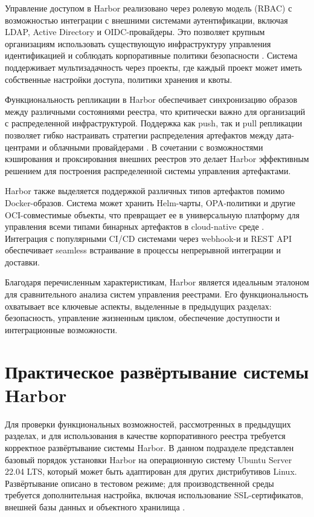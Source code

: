 Управление доступом в Harbor реализовано через ролевую модель (RBAC) с возможностью интеграции с внешними системами аутентификации, включая LDAP, Active Directory и OIDC-провайдеры. Это позволяет крупным организациям использовать существующую инфраструктуру управления идентификацией и соблюдать корпоративные политики безопасности \cite{cilic2023}. Система поддерживает мультизадачность через проекты, где каждый проект может иметь собственные настройки доступа, политики хранения и квоты.

Функциональность репликации в Harbor обеспечивает синхронизацию образов между различными состояниями реестра, что критически важно для организаций с распределенной инфраструктурой. Поддержка как push, так и pull репликации позволяет гибко настраивать стратегии распределения артефактов между дата-центрами и облачными провайдерами \cite{cncf-landscape}. В сочетании с возможностями кэширования и проксирования внешних реестров это делает Harbor эффективным решением для построения распределенной системы управления артефактами.

Harbor также выделяется поддержкой различных типов артефактов помимо Docker-образов. Система может хранить Helm-чарты, OPA-политики и другие OCI-совместимые объекты, что превращает ее в универсальную платформу для управления всеми типами бинарных артефактов в cloud-native среде \cite{cncf2022}. Интеграция с популярными CI/CD системами через webhook-и и REST API обеспечивает seamless встраивание в процессы непрерывной интеграции и доставки.

Благодаря перечисленным характеристикам, Harbor является идеальным эталоном для сравнительного анализа систем управления реестрами. Его функциональность охватывает все ключевые аспекты, выделенные в предыдущих разделах: безопасность, управление жизненным циклом, обеспечение доступности и интеграционные возможности.


\clearpage

\section{Практическое развёртывание системы Harbor}

Для проверки функциональных возможностей, рассмотренных в предыдущих разделах, и для использования в качестве корпоративного реестра требуется корректное развёртывание системы Harbor. В данном подразделе представлен базовый порядок установки Harbor на операционную систему Ubuntu Server 22.04 LTS, который может быть адаптирован для других дистрибутивов Linux. Развёртывание описано в тестовом режиме; для производственной среды требуется дополнительная настройка, включая использование SSL-сертификатов, внешней базы данных и объектного хранилища \cite{harbor-docs}.


